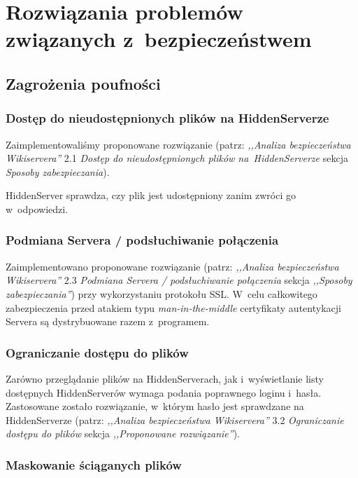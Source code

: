 \documentclass[a4paper,notitlepage]{article}
\begin{document}
\pagestyle{fancy}

\section{Rozwiązania problemów związanych z~bezpieczeństwem}
\subsection{Zagrożenia poufności}
\subsubsection{Dostęp do nieudostępnionych plików na HiddenServerze}
Zaimplementowaliśmy proponowane rozwiązanie (patrz: \emph{,,Analiza
bezpieczeństwa Wikiservera''} 2.1 \emph{Dostęp do nieudostępnionych
plików na~HiddenServerze} sekcja \emph{Sposoby zabezpieczania}). 

HiddenServer sprawdza, czy plik jest udostępniony zanim zwróci go 
w~odpowiedzi.

\subsubsection{Podmiana Servera / podsłuchiwanie połączenia}
Zaimplementowano proponowane rozwiązanie (patrz: \emph{,,Analiza
bezpieczeństwa Wikiservera''} 2.3 \emph{Podmiana Servera / podsłuchiwanie 
połączenia}
sekcja \emph{,,Sposoby zabezpieczania''}) przy wykorzystaniu protokołu
SSL. W~celu całkowitego zabezpieczenia przed atakiem typu 
\emph{man-in-the-middle} certyfikaty autentykacji Servera są dystrybuowane
razem z~programem.

\subsubsection{Ograniczanie dostępu do plików}
Zarówno przeglądanie plików na HiddenServerach, jak i~wyświetlanie
listy dostępnych HiddenServerów wymaga podania poprawnego loginu
i~hasła. Zastosowane zostało rozwiązanie, w~którym hasło jest 
sprawdzane na HiddenServerze (patrz: \emph{,,Analiza
bezpieczeństwa Wikiservera''} 3.2 \emph{Ograniczanie dostępu do plików}
sekcja \emph{,,Proponowane rozwiązanie''}).
\subsubsection{Maskowanie ściąganych plików}
\end{document}
